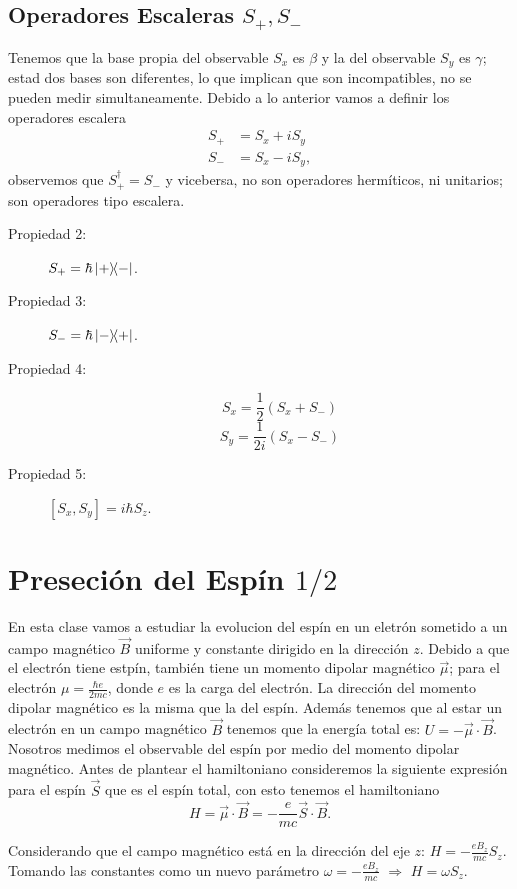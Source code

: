 \subsection{Operadores Escaleras $S_+,S_-$}
Tenemos que la base propia del observable $S_x$ es $\beta$ y la del observable $S_y$ es $\gamma$; estad dos bases son diferentes, lo que implican que son incompatibles, no se pueden medir simultaneamente. Debido a lo anterior vamos a definir los operadores escalera
	\begin{align}
		S_+ &= S_x + iS_y \\
		S_- &= S_x - iS_y,
	\end{align}
observemos que  $S_+ ^\dagger = S_-$ y vicebersa, no son operadores hermíticos, ni unitarios; son operadores tipo escalera.


\begin{description}
	\item[Propiedad 2: ] $S_+ = \hbar \ketbra{+}{-}$.
	\item[Propiedad 3: ] $S_- = \hbar \ketbra{-}{+}$.
	\item[Propiedad 4: ] 
		$$ S_x = \frac{1}{2} (S_x + S_-) $$
		$$ S_y = \frac{1}{2i} (S_x - S_-) $$
	\item[Propiedad 5: ] $[S_x ,S_y] = i\hbar S_z$.
\end{description}

\section{Preseción del Espín $1/2$}
En esta clase vamos a estudiar la evolucion del espín en un eletrón sometido a un campo magnético $\vec{B}$ uniforme y constante dirigido en la dirección $z$. Debido a que el electrón tiene estpín, también tiene un momento dipolar magnético $\vec{\mu}$; para el electrón $\mu = \frac{\hbar e}{2mc}$, donde $e$ es la carga del electrón. La dirección del momento dipolar magnético es la misma que la del espín. Además tenemos que al estar un electrón en un campo magnético $\vec{B}$ tenemos que la energía total es: $U = -\vec{\mu} \cdot \vec{B}$. Nosotros medimos el observable del espín por medio del momento dipolar magnético. Antes de plantear el hamiltoniano consideremos la siguiente expresión para el espín $\vec{S}$ que es el espín total, con esto tenemos el hamiltoniano
\begin{equation}
	H = \vec{\mu} \cdot \vec{B} = -\frac{e}{mc} \vec{S} \cdot \vec{B}.
\end{equation}

Considerando que el campo magnético está en la dirección del eje $z$: $H = -\frac{eB_z}{mc} S_z$. Tomando las constantes como un nuevo parámetro $\omega = -\frac{eB_z}{mc}$ $\Rightarrow$ $H = \omega S_z$.


